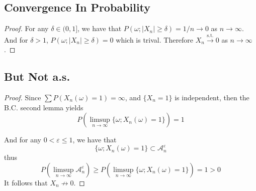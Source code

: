     \subsection{Convergence In Probability}
    \begin{proof}
        For any $\delta\in(0,1]$, we have that $P(\omega;|X_n|\geq\delta)
        =1/n\to 0$ as $n\to\infty$. And for $\delta>1$, $P(\omega;|X_n|\geq\delta)
        =0$ which is trival. Therefore $X_n\xrightarrow{\mathrm{s.t.}}0$ as
        $n\to\infty$.
    \end{proof}

    \subsection{But Not a.s.}
    \begin{proof}
        Since $\sum P(X_n(\omega)=1)=\infty$, and $\{X_n=1\}$ is
        independent,
        then the B.C. second lemma yields 
        \[P\left(\limsup_{n\to\infty}\{\omega;X_n(\omega)=1\}\right)=1\]

        And for any $0<\varepsilon\leq 1$, we have that
        \[\{\omega;X_n(\omega)=1\}\subset\mathcal A_n^\varepsilon\]
        thus
        \[P\left(\limsup_{n\to\infty}\mathcal A_n^\varepsilon\right)\geq
        P\left(\limsup_{n\to\infty}\{\omega;X_n(\omega)=1\}\right)=1>0\]
        It follows that 
        $X_n\not\to 0$.
    \end{proof}

